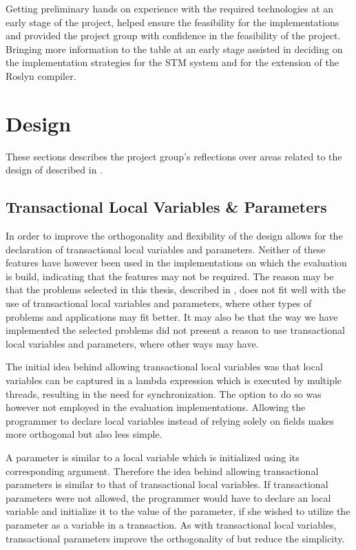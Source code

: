 Getting preliminary hands on experience with the required technologies at an early stage of the project, helped ensure the feasibility for the implementations and provided the project group with confidence in the feasibility of the project. Bringing more information to the table at an early stage assisted in deciding on the implementation strategies for the \ac{STM} system and for the extension of the Roslyn compiler.

\section{Design}\label{sec:reflection_design}
These sections describes the project group’s reflections over areas related to the design of \stmname described in .

\subsection{Transactional Local Variables \& Parameters}
In order to improve the orthogonality and flexibility of \stmname the design allows for the declaration of transactional local variables and parameters. Neither of these features have however been used in the implementations on which the evaluation is build, indicating that the features may not be required. The reason may be that the problems selected in this thesis, described in , does not fit well with the use of transactional local variables and parameters, where other types of problems and applications may fit better. It may also be that the way we have implemented the selected problems did not present a reason to use transactional local variables and parameters, where other ways may have.

The initial idea behind allowing transactional local variables was that local variables can be captured in a lambda expression which is executed by multiple threads, resulting in the need for synchronization. The option to do so was however not employed in the evaluation implementations. Allowing the programmer to declare  local variables instead of relying solely on  fields makes \stmnamesp more orthogonal but also less simple.

A parameter is similar to a local variable which is initialized using its corresponding argument\cite[p. 76]{sestoft2011c}. Therefore the idea behind allowing transactional parameters is similar to that of transactional local variables. If transactional parameters were not allowed, the programmer would have to declare an  local variable and initialize it to the value of the parameter, if she wished to utilize the parameter as a variable in a transaction. As with transactional local variables, transactional parameters improve the orthogonality of \stmname but reduce the simplicity.

